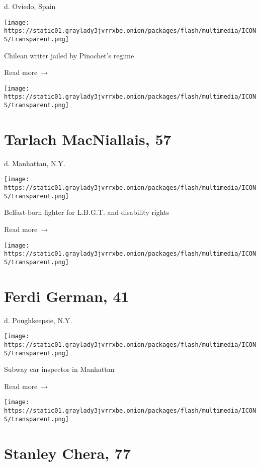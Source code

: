 d. Oviedo, Spain

\texttt{[image: https://static01.graylady3jvrrxbe.onion/packages/flash/multimedia/ICONS/transparent.png]}

Chilean writer jailed by Pinochet's regime

 Read more~→

\href{https://www.nytimes3xbfgragh.onion/2020/04/17/obituaries/tarlach-macniallais-dead-coronavirus.html}{}

\texttt{[image: https://static01.graylady3jvrrxbe.onion/packages/flash/multimedia/ICONS/transparent.png]}

\hypertarget{tarlach-macniallais-57}{%
\section{Tarlach MacNiallais, 57}\label{tarlach-macniallais-57}}

d. Manhattan, N.Y.

\texttt{[image: https://static01.graylady3jvrrxbe.onion/packages/flash/multimedia/ICONS/transparent.png]}

Belfast-born fighter for L.B.G.T. and disability rights

 Read more~→

\href{https://www.nytimes3xbfgragh.onion/2020/04/17/obituaries/ferdi-german-dead-coronavirus.html}{}

\texttt{[image: https://static01.graylady3jvrrxbe.onion/packages/flash/multimedia/ICONS/transparent.png]}

\hypertarget{ferdi-german-41}{%
\section{Ferdi German, 41}\label{ferdi-german-41}}

d. Poughkeepsie, N.Y.

\texttt{[image: https://static01.graylady3jvrrxbe.onion/packages/flash/multimedia/ICONS/transparent.png]}

Subway car inspector in Manhattan

 Read more~→

\href{https://www.nytimes3xbfgragh.onion/2020/04/17/us/stanley-chera-dead-coronavirus.html}{}

\texttt{[image: https://static01.graylady3jvrrxbe.onion/packages/flash/multimedia/ICONS/transparent.png]}

\hypertarget{stanley-chera-77}{%
\section{Stanley Chera, 77}\label{stanley-chera-77}}

